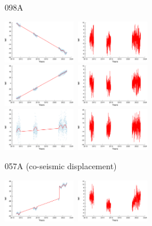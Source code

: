 \documentclass[landscape,a0paper,fontscale=0.346]{baposter} %
\begin{document}
\begin{poster}
{\begin{minipage}[c]{0.34\linewidth}
\begin{center}
098A
\end{center}
\vfill
{}
  \includegraphics[height=5em]{098a_0_data.png}~\includegraphics[height=5em]{098a_0_res.png}\\
  \includegraphics[height=5em]{098a_1_data.png}~\includegraphics[height=5em]{098a_1_res.png}\\
  \includegraphics[height=5em]{098a_2_data.png}~\includegraphics[height=5em]{098a_2_res.png}
\vfill
\end{minipage}
\begin{minipage}[c]{0.33\linewidth}
\begin{center}
057A (co-seismic displacement)
\end{center}
  \includegraphics[height=5em]{057a_0_data.png}~\includegraphics[height=5em]{057a_0_res.png}\\

\end{minipage}}
\end{poster}
\end{document}
